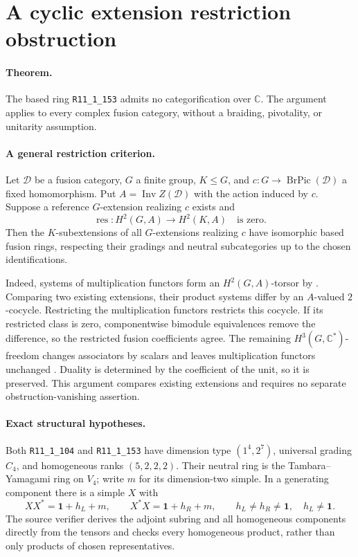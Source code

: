 \section{A cyclic extension restriction obstruction}
\label{sec:rank11-c4}

\paragraph{Theorem.}
The based ring \texttt{R11\_1\_153} admits no categorification over
$\mathbb C$. The argument applies to every complex fusion category,
without a braiding, pivotality, or unitarity assumption.

\paragraph{A general restriction criterion.}
Let $\mathcal D$ be a fusion category, $G$ a finite group, $K\le G$, and
$c:G\to\operatorname{BrPic}(\mathcal D)$ a fixed homomorphism.
Put $A=\operatorname{Inv}Z(\mathcal D)$ with the action induced by $c$.
Suppose a reference $G$-extension realizing $c$ exists and
\[
 \operatorname{res}:H^2(G,A)\longrightarrow H^2(K,A)
 \quad\text{is zero.}
\]
Then the $K$-subextensions of all $G$-extensions realizing $c$ have
isomorphic based fusion rings, respecting their gradings and neutral
subcategories up to the chosen identifications.

Indeed, systems of multiplication functors form an $H^2(G,A)$-torsor
by \cite[Theorem~8.5]{ENOHomotopy}. Comparing two existing extensions,
their product systems differ by an $A$-valued $2$-cocycle. Restricting
the multiplication functors restricts this cocycle. If its restricted
class is zero, componentwise bimodule equivalences remove the
difference, so the restricted fusion coefficients agree. The remaining
$H^3(G,\mathbb C^*)$-freedom changes associators by scalars and leaves
multiplication functors unchanged
\cite[Theorem~8.9]{ENOHomotopy}. Duality is determined by the coefficient
of the unit, so it is preserved. This argument compares existing
extensions and requires no separate obstruction-vanishing assertion.

\paragraph{Exact structural hypotheses.}
Both \texttt{R11\_1\_104} and \texttt{R11\_1\_153} have dimension type
$(1^4,2^7)$, universal grading $C_4$, and homogeneous ranks $(5,2,2,2)$.
Their neutral ring is the Tambara--Yamagami ring on $V_4$; write $m$ for
its dimension-two simple. In a generating component there is a simple
$X$ with
\[
 XX^*=\mathbf1+h_L+m,\qquad X^*X=\mathbf1+h_R+m,
 \qquad h_L\ne h_R\ne\mathbf1,\quad h_L\ne\mathbf1.
\]
The source verifier derives the adjoint subring and all homogeneous
components directly from the tensors and checks every homogeneous
product, rather than only products of chosen representatives.

